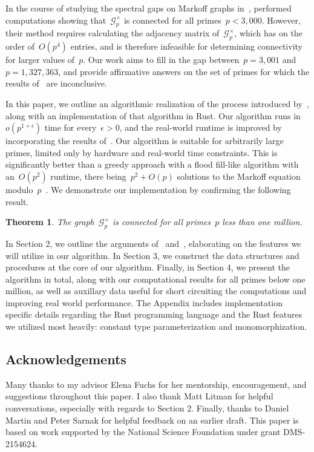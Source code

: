 \documentclass{article}
\newtheorem{theorem}{Theorem}
\theoremstyle{definition}
\theoremstyle{remark}
\begin{document}
In the course of studying the spectral gaps on Markoff graphs in~\cite{experiments}, \citeauthor{experiments} performed computations showing that~$\mathcal{G}_p^\times$ is connected for all primes~$p < 3,000$.
However, their method requires calculating the adjacency matrix of~$\mathcal{G}_p^\times$, which has on the order of~$O(p^4)$ entries, and is therefore infeasible for determining connectivity for larger values of~$p$.
Our work aims to fill in the gap between~$p = 3,001$ and~$p = 1,327,363$, and provide affirmative answers on the set of primes for which the results of~\cite{fuchs} are inconclusive.

In this paper, we outline an algorithmic realization of the process introduced by~\citeauthor{bgs}, along with an implementation of that algorithm in Rust.
Our algorithm runs in~$o(p^{1 + \epsilon})$ time for every~$\epsilon > 0$, and the real-world runtime is improved by incorporating the results of~\cite{fuchs}.
Our algorithm is suitable for arbitrarily large primes, limited only by hardware and real-world time constraints.
This is significantly better than a greedy approach with a flood fill-like algorithm with an~$O(p^2)$ runtime, there being~$p^2 + O(p)$ solutions to the Markoff equation modulo~$p$~\cite[Proposition 2.1]{experiments}.
We demonstrate our implementation by confirming the following result.

\begin{theorem}\label{thm:comp-results}
    The graph~$\mathcal{G}_p^\times$ is connected for all primes~$p$ less than one million.
\end{theorem}

In Section 2, we outline the arguments of~\cite{bgs} and~\cite{fuchs}, elaborating on the features we will utilize in our algorithm.
In Section 3, we construct the data structures and procedures at the core of our algorithm.
Finally, in Section 4, we present the algorithm in total, along with our computational results for all primes below one million, as well as auxillary data useful for short circuiting the computations and improving real world performance.
The Appendix includes implementation specific details regarding the Rust programming language and the Rust features we utilized most heavily: constant type parameterization and monomorphization.

\subsection*{Acknowledgements}
Many thanks to my advisor Elena Fuchs for her mentorship, encouragement, and suggestions throughout this paper.
I also thank Matt Litman for helpful conversations, especially with regards to Section 2.
Finally, thanks to Daniel Martin and Peter Sarnak for helpful feedback on an earlier draft.
This paper is based on work supported by the National Science Foundation under grant DMS-2154624.
\end{document}
